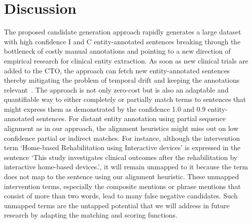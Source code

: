 \documentclass[letterpaper]{article} %
\begin{document}
\section{Discussion}
\label{sec:discussion}
%
The proposed candidate generation approach rapidly generates a large dataset with high confidence I and C entity-annotated sentences breaking through the bottleneck of costly manual annotations and pointing to a new direction of empirical research for clinical entity extraction.
As soon as new clinical trials are added to the CTO, the approach can fetch new entity-annotated sentences thereby mitigating the problem of temporal drift and keeping the annotations relevant~\cite{derczynski2016broad}.
The approach is not only zero-cost but is also an adaptable and quantifiable way to either completely or partially match terms to sentences that might express them as demonstrated by the confidence 1.0 and 0.9 entity-annotated sentences.
For distant entity annotation using partial sequence alignment as in our approach, the alignment heuristics might miss out on low confidence partial or indirect matches.
For instance, although the intervention term `Home-based Rehabilitation using Interactive devices' is expressed in the sentence `This study investigates clinical outcomes after the rehabilitation by interactive home-based devices.', it will remain unmapped to it because the term does not map to the sentence using our alignment heuristic.
These unmapped intervention terms, especially the composite mentions or phrase mentions that consist of more than two words, lead to many false negative candidates.
Such unmapped terms are the untapped potential that we will address in future research by adapting the matching and scoring functions.
\end{document}
